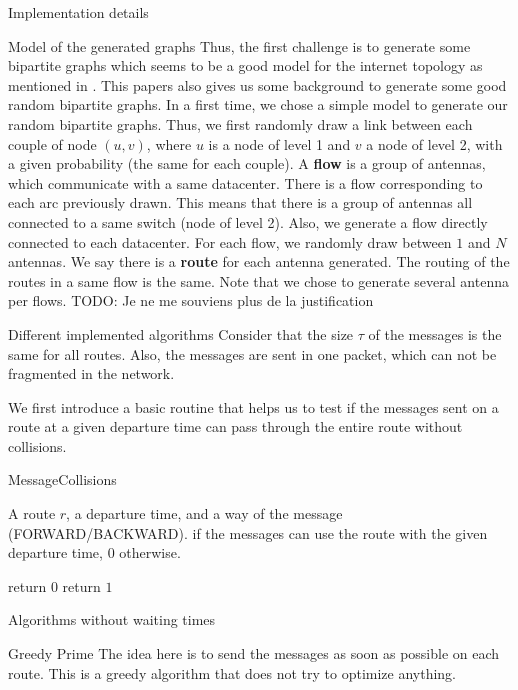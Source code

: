 \documentclass[10pt]{article}
\newcommand{\todo}[1]{{\color{red} TODO: {#1}}}
\begin{document}
\begin{section}{Implementation details}
\begin{subsection}{Model of the generated graphs}
  Thus, the first challenge is to generate some bipartite graphs which seems to be a good model for the internet topology as mentioned in \cite{tarissan_towards_2013}. This papers also gives us some background to generate some good random bipartite graphs. In a first time, we chose a simple model to generate our random bipartite graphs. Thus, we first randomly draw a link between each couple of node $(u,v)$, where $u$ is a node of level 1 and $v$ a node of level 2, with a given probability (the same for each couple).
 A {\bf flow} is a group of antennas, which communicate with a same datacenter.   There is a flow corresponding to each arc previously drawn. This means that there is a group of antennas all connected to a same switch (node of level 2). Also, we generate a flow directly connected to each datacenter. For each flow, we randomly draw between $1$ and $N$ antennas.
  We say there is a {\bf route} for each antenna generated. The routing of the routes in a same flow is the same. 
  Note that we chose to generate several antenna per flows. \todo{Je ne me souviens plus de la justification}
  
  \end{subsection}
  
  \begin{subsection}{Different implemented algorithms}
  Consider that the size $\tau$ of the messages is the same for all routes. Also, the messages are sent in one packet, which can not be fragmented in the network.
  
  We first introduce a basic routine that helps us to test if the messages sent on a route at a given departure time can pass through the entire route without collisions.
  
    	\begin{algorithm}[H]
 	\caption{MessageCollisions}
 	\begin{algorithmic}
 	\REQUIRE A route $r$, a departure time, and a way of the message (FORWARD/BACKWARD).
	 if the messages can use the route with the given departure time, $0$ otherwise.

 	\STATE return $0$
 	\ENDIF
 	\ENDFOR
	\STATE return $1$
 	\end{algorithmic}
 	\end{algorithm}
  \begin{subsection}{Algorithms without waiting times}
  \begin{subsubsection}{Greedy Prime}
  The idea here is to send the messages as soon as possible on each route. This is a greedy algorithm that does not try to optimize anything.


\end{subsubsection}
\end{subsection}
\end{subsection}
\end{section}
\end{document}
